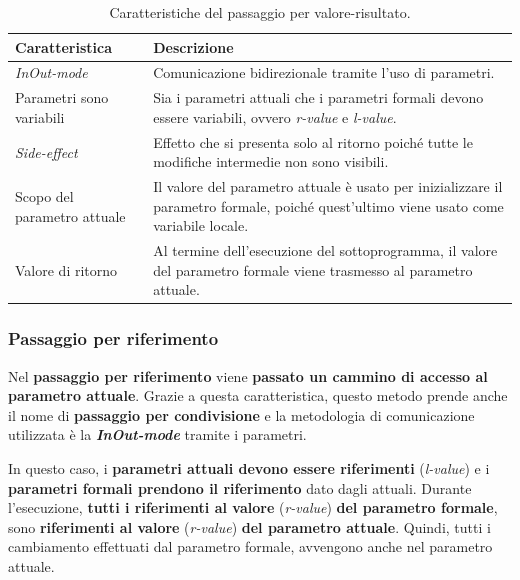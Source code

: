\documentclass[a4paper]{article}
\begin{document}
	\begin{table}[!htp]
		\centering
		\begin{tabular}{@{} l p{20em} @{}}
			\toprule
			Caratteristica & Descrizione \\
			\midrule
			\emph{InOut-mode}			& Comunicazione bidirezionale tramite l'uso di parametri. \\ [0.5em]
			Parametri sono variabili	& Sia i parametri attuali che i parametri formali devono essere variabili, ovvero \emph{r-value} e \emph{l-value}. \\ [0.5em]
			\emph{Side-effect}			& Effetto che si presenta solo al ritorno poiché tutte le modifiche intermedie non sono visibili. \\ [0.5em]
			Scopo del parametro attuale	& Il valore del parametro attuale è usato per inizializzare il parametro formale, poiché quest'ultimo viene usato come variabile locale. \\ [0.5em]
			Valore di ritorno			& Al termine dell'esecuzione del sottoprogramma, il valore del parametro formale viene trasmesso al parametro attuale. \\
			\bottomrule
		\end{tabular}
		\caption{Caratteristiche del passaggio per valore-risultato.}
	\end{table}\newpage
	
	\subsubsection{Passaggio per riferimento}
	
	Nel \textcolor{Red3}{\textbf{passaggio per riferimento}} viene \textbf{passato un cammino di accesso al parametro attuale}. Grazie a questa caratteristica, questo metodo prende anche il nome di \textcolor{Red3}{\textbf{passaggio per condivisione}} e la metodologia di comunicazione utilizzata è la \textbf{\emph{InOut-mode}} tramite i parametri.\newline
	
	\noindent
	In questo caso, i \textbf{parametri attuali devono essere riferimenti} (\emph{l-value}) e i \textbf{parametri formali prendono il riferimento} dato dagli attuali. Durante l'esecuzione, \textbf{tutti i riferimenti al valore} (\emph{r-value}) \textbf{del parametro formale}, sono \textbf{riferimenti al valore} (\emph{r-value}) \textbf{del parametro attuale}. Quindi, tutti i cambiamento effettuati dal parametro formale, avvengono anche nel parametro attuale.\newline
	
\end{document}
